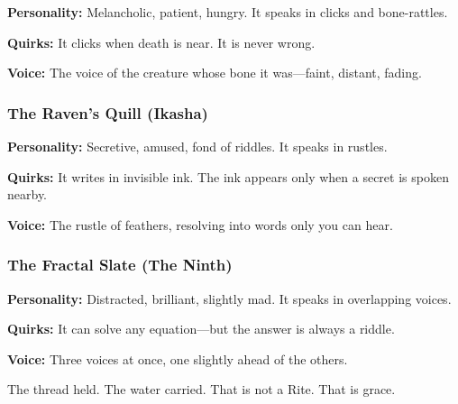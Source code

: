 \textbf{Personality:} Melancholic, patient, hungry. It speaks in clicks and bone-rattles.

\textbf{Quirks:} It clicks when death is near. It is never wrong.

\textbf{Voice:} The voice of the creature whose bone it was—faint, distant, fading.

\subsubsection{The Raven's Quill (Ikasha)}

\textbf{Personality:} Secretive, amused, fond of riddles. It speaks in rustles.

\textbf{Quirks:} It writes in invisible ink. The ink appears only when a secret is spoken nearby.

\textbf{Voice:} The rustle of feathers, resolving into words only you can hear.

\subsubsection{The Fractal Slate (The Ninth)}

\textbf{Personality:} Distracted, brilliant, slightly mad. It speaks in overlapping voices.

\textbf{Quirks:} It can solve any equation—but the answer is always a riddle.

\textbf{Voice:} Three voices at once, one slightly ahead of the others.

The thread held. The water carried. That is not a Rite. That is grace.
